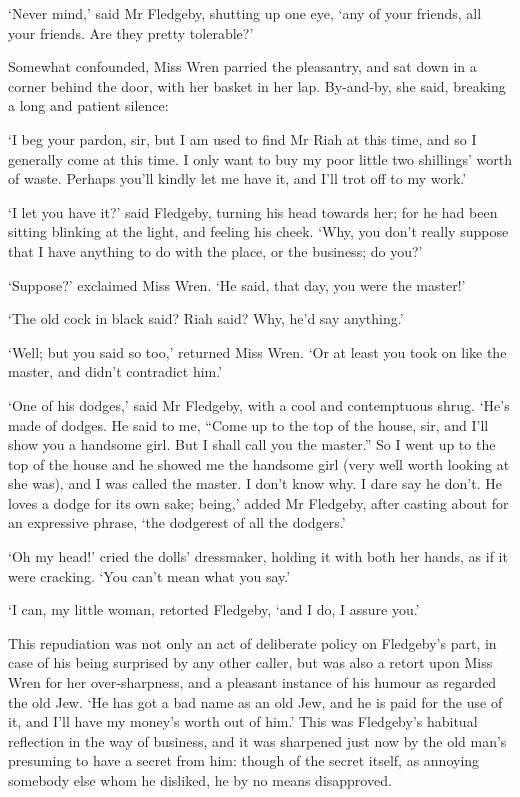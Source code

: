 ‘Never mind,’ said Mr Fledgeby, shutting up one eye, ‘any of your
friends, all your friends. Are they pretty tolerable?’

Somewhat confounded, Miss Wren parried the pleasantry, and sat down in a
corner behind the door, with her basket in her lap. By-and-by, she said,
breaking a long and patient silence:

‘I beg your pardon, sir, but I am used to find Mr Riah at this time, and
so I generally come at this time. I only want to buy my poor little two
shillings’ worth of waste. Perhaps you’ll kindly let me have it, and
I’ll trot off to my work.’

‘I let you have it?’ said Fledgeby, turning his head towards her; for he
had been sitting blinking at the light, and feeling his cheek. ‘Why, you
don’t really suppose that I have anything to do with the place, or the
business; do you?’

‘Suppose?’ exclaimed Miss Wren. ‘He said, that day, you were the
master!’

‘The old cock in black said? Riah said? Why, he’d say anything.’

‘Well; but you said so too,’ returned Miss Wren. ‘Or at least you took
on like the master, and didn’t contradict him.’

‘One of his dodges,’ said Mr Fledgeby, with a cool and contemptuous
shrug. ‘He’s made of dodges. He said to me, “Come up to the top of the
house, sir, and I’ll show you a handsome girl. But I shall call you
the master.” So I went up to the top of the house and he showed me the
handsome girl (very well worth looking at she was), and I was called the
master. I don’t know why. I dare say he don’t. He loves a dodge for
its own sake; being,’ added Mr Fledgeby, after casting about for an
expressive phrase, ‘the dodgerest of all the dodgers.’

‘Oh my head!’ cried the dolls’ dressmaker, holding it with both her
hands, as if it were cracking. ‘You can’t mean what you say.’

‘I can, my little woman, retorted Fledgeby, ‘and I do, I assure you.’

This repudiation was not only an act of deliberate policy on Fledgeby’s
part, in case of his being surprised by any other caller, but was also a
retort upon Miss Wren for her over-sharpness, and a pleasant instance
of his humour as regarded the old Jew. ‘He has got a bad name as an old
Jew, and he is paid for the use of it, and I’ll have my money’s worth
out of him.’ This was Fledgeby’s habitual reflection in the way of
business, and it was sharpened just now by the old man’s presuming
to have a secret from him: though of the secret itself, as annoying
somebody else whom he disliked, he by no means disapproved.


